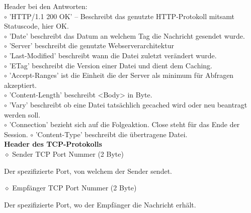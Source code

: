 \documentclass[11pt]{article}
\begin{document}
\begin{enumerate}[\thesection .1]
        Header bei den Antworten:\\
        $\circ$ 'HTTP/1.1 200 OK' -- Beschreibt das genutzte HTTP-Protokoll mitsamt Statuscode, hier OK.\\
        $\circ$ 'Date' beschreibt das Datum an welchem Tag die Nachricht gesendet wurde.\\
        $\circ$ 'Server' beschreibt die genutzte Webserverarchitektur\\
        $\circ$ 'Last-Modified' beschreibt wann die Datei zuletzt verändert wurde.\\
        $\circ$ 'ETag' beschreibt die Version einer Datei und dient dem Caching.\\
        $\circ$ 'Accept-Ranges' ist die Einheit die der Server als minimum für Abfragen akzeptiert.\\
        $\circ$ 'Content-Length' beschreibt <Body> in Byte.\\
        $\circ$ 'Vary' beschreibt ob eine Datei tatsächlich gecached wird oder neu beantragt werden soll.\\
        $\circ$ 'Connection' bezieht sich auf die Folgeaktion. Close steht für das Ende der Session.
        $\circ$ 'Content-Type' beschreibt die übertragene Datei.\\

        \textbf{Header des TCP-Protokolls}\\
        $\diamond$ Sender TCP Port Nummer (2 Byte)
        \begin{addmargin}[1em]{1em}
            Der spezifizierte Port, von welchem der Sender sendet.
        \end{addmargin}

        $\diamond$ Empfänger TCP Port Nummer (2 Byte)
        \begin{addmargin}[1em]{1em}
            Der spezifizierte Port, wo der Empfänger die Nachricht erhält.
        \end{addmargin}


\end{enumerate}
\end{document}
